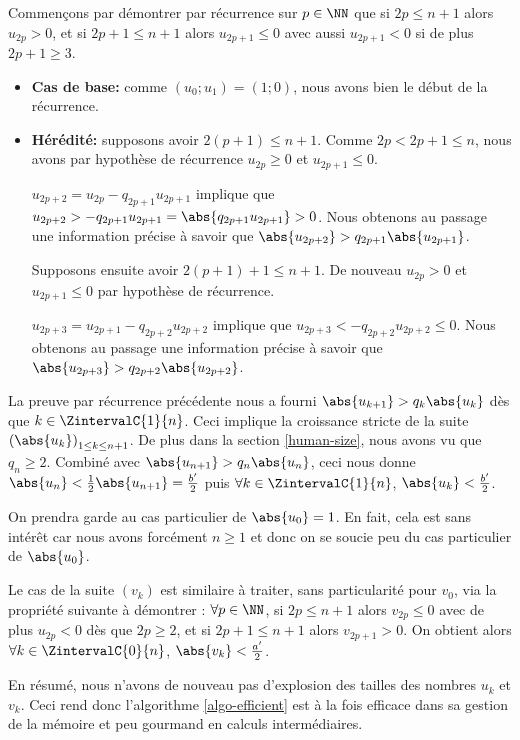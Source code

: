 \medskip


Commençons par démontrer par récurrence sur $p \in \NN$ que si $2p \leq n+1$ alors $u_{2p} > 0$, et si $2p + 1 \leq n+1$ alors $u_{2p+1} \leq 0$ avec aussi $u_{2p+1} < 0$ si de plus $2p+1 \geq 3$.

\begin{itemize}[label = \small\textbullet]
	\item \textbf{Cas de base:} comme $(u_0 ; u_1) = (1 ; 0)$, nous avons bien le début de la récurrence.


	\item  \textbf{Hérédité:} supposons avoir $2(p+1) \leq n+1$. Comme $2p < 2p + 1 \leq n$, nous avons par hypothèse de récurrence $u_{2p} \geq 0$ et $u_{2p+1} \leq 0$.
	
	\noindent
	$u_{2p+2} = u_{2p} - q_{2p+1} u_{2p+1}$ implique que 
	$u_{2p+2} > - q_{2p+1} u_{2p+1} = \abs{q_{2p+1} u_{2p+1}} > 0$.
	Nous obtenons au passage une information précise à savoir que $\abs{u_{2p+2}} > q_{2p+1} \abs{u_{2p+1}}$.
	
	
	\medskip
	\noindent
	Supposons ensuite avoir $2(p+1) + 1 \leq n+1$. De nouveau $u_{2p} > 0$ et $u_{2p+1} \leq 0$ par hypothèse de récurrence.
	
	\noindent
	$u_{2p+3} = u_{2p+1} - q_{2p+2} u_{2p+2}$ implique que
	$u_{2p+3} < - q_{2p+2} u_{2p+2} \leq 0$.
	Nous obtenons au passage une information précise à savoir que $\abs{u_{2p+3}} > q_{2p+2} \abs{u_{2p+2}}$.
\end{itemize}


La preuve par récurrence précédente nous a fourni $\abs{u_{k+1}} > q_k \abs{u_k}$ dès que $k \in \ZintervalC{1}{n}$. Ceci implique la croissance stricte de la suite $\left( \abs{u_k} \right)_{1 \leq k \leq n+1}$.
De plus dans la section \ref{human-size}, nous avons vu que $q_n \geq 2$. Combiné avec $\abs{u_{n+1}} > q_n \abs{u_n}$, ceci nous donne $\abs{u_n} < \frac{1}{2} \abs{u_{n+1}} = \frac{b^\prime}{2}$ puis $\forall k \in \ZintervalC{1}{n}$, $\abs{u_k} < \frac{b^\prime}{2}$.


\medskip


On prendra garde au cas particulier de $\abs{u_0} = 1$. En fait, cela est sans intérêt car nous avons forcément $n \geq 1$ et donc on se soucie peu du cas particulier de $\abs{u_0}$. 


\medskip


Le cas de la suite $(v_k)$ est similaire à traiter, sans particularité pour $v_0$, via la propriété suivante à démontrer :
$\forall p \in \NN$, si $2p \leq n+1$ alors $v_{2p} \leq 0$ avec de plus $u_{2p} < 0$ dès que $2p \geq 2$, et si $2p + 1 \leq n+1$ alors $v_{2p+1} > 0$.
On obtient alors $\forall k \in \ZintervalC{0}{n}$, $\abs{v_k} < \frac{a^\prime}{2}$.


\medskip


En résumé, nous n'avons de nouveau pas d'explosion des tailles des nombres $u_k$ et $v_k$. Ceci rend donc l'algorithme \ref{algo-efficient} est à la fois efficace dans sa gestion de la mémoire et peu gourmand en calculs intermédiaires.